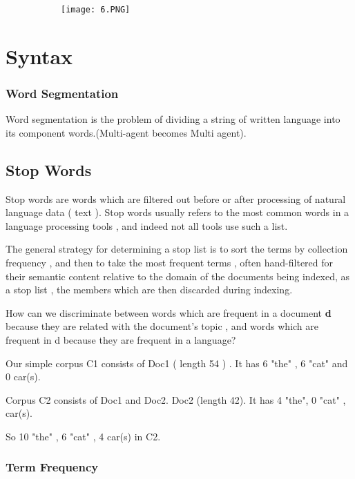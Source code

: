 \documentclass{article}
\begin{document}
\begin{figure}[ht!]
  \centering
  \begin{subfigure}[b]{1\linewidth}
    \texttt{[image: 6.PNG]}
  \end{subfigure}
\end{figure}

\section{Syntax}
\subsubsection{Word Segmentation}

Word segmentation is the problem of dividing a string of written language into its component words.(Multi-agent becomes Multi agent).

\subsection{Stop Words}

Stop words are words which are filtered out before or after processing of natural language data ( text ). Stop words usually refers to the most common words in a language processing tools , and indeed not all tools use such a list.

The general strategy for determining a stop list is to sort the terms by collection frequency , and then to take the most frequent terms , often hand-filtered for their semantic content relative to the domain of the documents being indexed, as a stop list , the members which are then discarded during indexing.

How can we discriminate between words which are frequent in a document \textbf{d} because they are related with the document's topic , and words which are frequent in d because they are frequent in a language?

Our simple corpus C1 consists of Doc1 ( length 54 ) . It has 6 "the" , 6 "cat" and 0 car(s). 

Corpus C2 consists of Doc1 and Doc2. Doc2 (length 42). It has 4 "the", 0 "cat" , car(s).

So 10 "the" , 6 "cat" , 4 car(s) in C2.


\subsubsection{Term Frequency}
\end{document}
